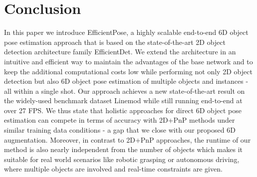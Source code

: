 \documentclass[twocolumn, 10pt, letterpaper]{article}
\begin{document}
\section{Conclusion}
\label{section_conclusion}
In this paper we introduce EfficientPose, a highly scalable end-to-end 6D object pose estimation approach that is based on the state-of-the-art 2D object detection architecture family EfficientDet\cite{EfficientDet}. We extend the architecture in an intuitive and efficient way to maintain the advantages of the base network and to keep the additional computational costs low while performing not only 2D object detection but also 6D object pose estimation of multiple objects and instances - all within a single shot. Our approach achieves a new state-of-the-art result on the widely-used benchmark dataset Linemod while still running end-to-end at over 27 FPS. We thus state that holistic approaches for direct 6D object pose estimation can compete in terms of accuracy with 2D+PnP methods under similar training data conditions - a gap that we close with our proposed 6D augmentation. Moreover, in contrast to 2D+PnP approaches, the runtime of our method is also nearly independent from the number of objects which makes it suitable for real world scenarios like robotic grasping or autonomous driving, where multiple objects are involved and real-time constraints are given.



\end{document}

